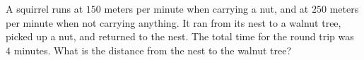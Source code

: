 A squirrel runs at $150$ meters per minute when carrying a nut, and at $250$ meters per minute when not carrying anything. It ran from its nest to a walnut tree, picked up a nut, and returned to the nest. The total time for the round trip was $4$ minutes. What is the distance from the nest to the walnut tree?

